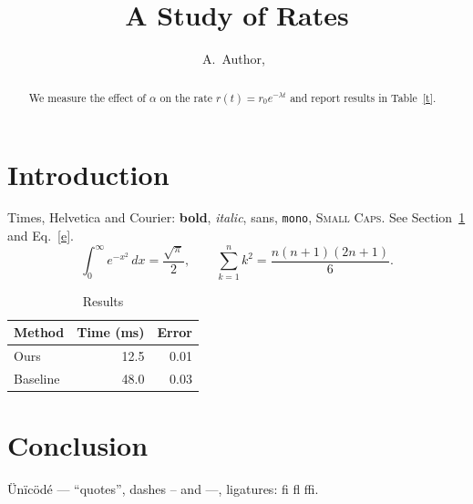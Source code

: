 \documentclass[journal]{IEEEtran}
\title{A Study of Rates}\author{A.~Author,~\IEEEmembership{Member,~IEEE}}
\begin{document}
\maketitle
\begin{abstract}
We measure the effect of $\alpha$ on the rate $r(t)=r_0e^{-\lambda t}$ and report results in Table~\ref{t}.
\end{abstract}
\section{Introduction}\label{s}
Times, Helvetica and Courier: \textbf{bold}, \textit{italic}, \textsf{sans}, \texttt{mono}, \textsc{Small Caps}. See Section~\ref{s} and Eq.~\eqref{e}.
\begin{equation}\label{e}
\int_0^\infty e^{-x^2}\,dx=\frac{\sqrt\pi}{2},\qquad \sum_{k=1}^{n}k^2=\frac{n(n+1)(2n+1)}{6}.
\end{equation}
\begin{table}[t]\centering\caption{Results}\label{t}
\begin{tabular}{lrr}\hline Method & Time (ms) & Error\\\hline Ours & 12.5 & 0.01\\ Baseline & 48.0 & 0.03\\\hline\end{tabular}
\end{table}
\section{Conclusion}
Ünïcödé — “quotes”, dashes -- and ---, ligatures: fi fl ffi.
\end{document}

